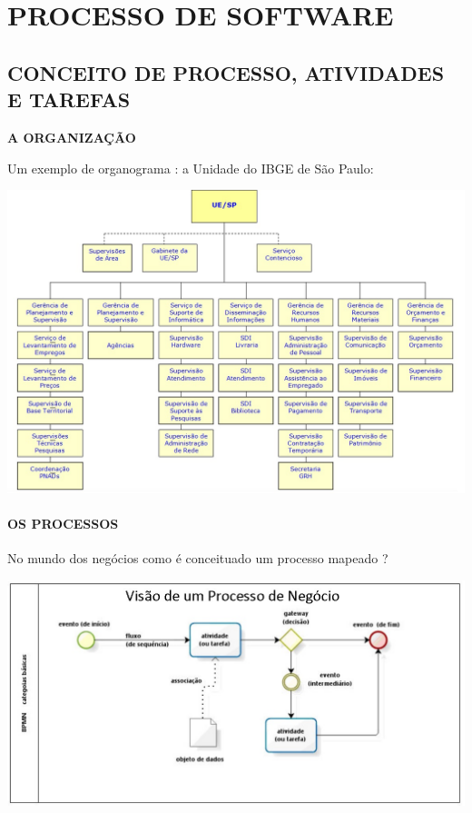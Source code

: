 \documentclass[
]{book}
\begin{document}
\chapter{PROCESSO DE SOFTWARE}\label{processo-de-software}

\section{CONCEITO DE PROCESSO, ATIVIDADES E TAREFAS}\label{conceito-de-processo-atividades-e-tarefas}

\textbf{A ORGANIZAÇÃO}

Um exemplo de organograma : a Unidade do IBGE de São Paulo:

\includegraphics{images/organogramas/SES-SP.jpg}

\subsubsection{OS PROCESSOS}\label{os-processos}

No mundo dos negócios como é conceituado um processo mapeado ?

\includegraphics{images/processos/ProcessosNegocio.jpg}
\end{document}
